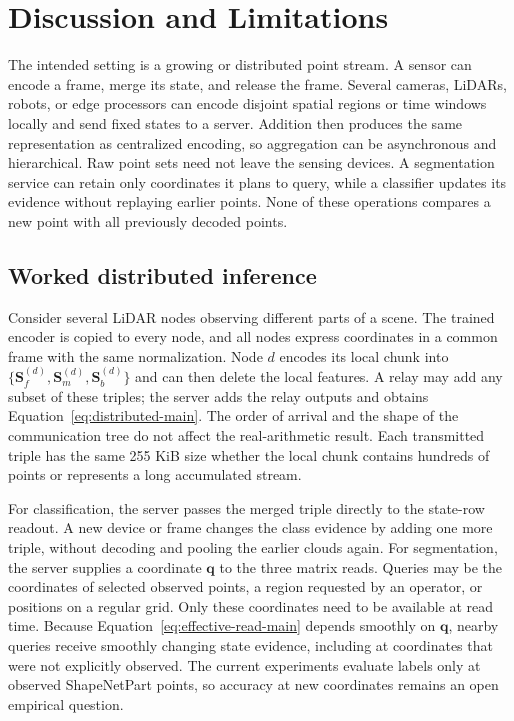 \documentclass[times,twocolumn,final,authoryear]{elsarticle}
\newcommand{\Sstate}{\mathbf{S}}
\begin{document}
\section{Discussion and Limitations}
The intended setting is a growing or distributed point stream. A sensor can encode a frame, merge its state, and release the frame. Several cameras, LiDARs, robots, or edge processors can encode disjoint spatial regions or time windows locally and send fixed states to a server. Addition then produces the same representation as centralized encoding, so aggregation can be asynchronous and hierarchical. Raw point sets need not leave the sensing devices. A segmentation service can retain only coordinates it plans to query, while a classifier updates its evidence without replaying earlier points. None of these operations compares a new point with all previously decoded points.

\subsection{Worked distributed inference}
Consider several LiDAR nodes observing different parts of a scene. The trained encoder is copied to every node, and all nodes express coordinates in a common frame with the same normalization. Node $d$ encodes its local chunk into $\{\Sstate_f^{(d)},\Sstate_m^{(d)},\Sstate_b^{(d)}\}$ and can then delete the local features. A relay may add any subset of these triples; the server adds the relay outputs and obtains Equation~\eqref{eq:distributed-main}. The order of arrival and the shape of the communication tree do not affect the real-arithmetic result. Each transmitted triple has the same 255 KiB size whether the local chunk contains hundreds of points or represents a long accumulated stream.

For classification, the server passes the merged triple directly to the state-row readout. A new device or frame changes the class evidence by adding one more triple, without decoding and pooling the earlier clouds again. For segmentation, the server supplies a coordinate $\bm q$ to the three matrix reads. Queries may be the coordinates of selected observed points, a region requested by an operator, or positions on a regular grid. Only these coordinates need to be available at read time. Because Equation~\eqref{eq:effective-read-main} depends smoothly on $\bm q$, nearby queries receive smoothly changing state evidence, including at coordinates that were not explicitly observed. The current experiments evaluate labels only at observed ShapeNetPart points, so accuracy at new coordinates remains an open empirical question.
\end{document}
